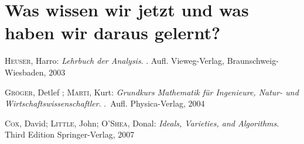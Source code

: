 \documentclass{article}
\begin{document}
\section{Was wissen wir jetzt und was haben wir daraus gelernt?}

\begin{thebibliography}{99}
	\textsc{Heuser}, Harro:
	\newblock \emph{Lehrbuch der Analysis}.
	. Aufl.
	\newblock Vieweg-Verlag, Braunschweig-Wiesbaden, 2003
	
	\textsc{Gr{\"o}ger}, Detlef ; \textsc{Marti}, Kurt:
	\newblock \emph{Grundkurs Mathematik für Ingenieure, Natur- und
		Wirtschaftswissenschaftler}.
	.~Aufl.
	\newblock Physica-Verlag, 2004

	\textsc{Cox}, David; \textsc{Little}, John; \textsc{O'Shea}, Donal:
	\newblock \emph{Ideals, Varieties, and Algorithms}.
	\newblock Third Edition
	\newblock Springer-Verlag, 2007
\end{thebibliography}
\end{document}
